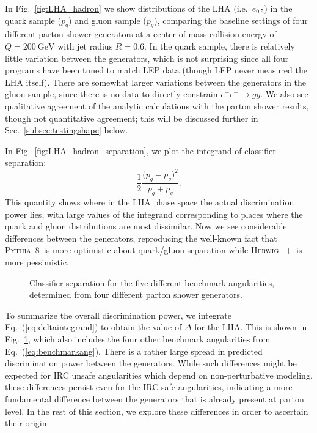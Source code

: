 \documentclass[11pt,letterpaper]{article}
\newcommand{\GeV}{\text{GeV}}
\newcommand{\pythia}{\textsc{Pythia~8}\xspace}
\newcommand{\herwig}{\textsc{Herwig++}\xspace}
\DeclareRobustCommand{\Sec}[1]{Sec.~\ref{#1}}
\DeclareRobustCommand{\Fig}[1]{Fig.~\ref{#1}}
\DeclareRobustCommand{\Eq}[1]{Eq.~(\ref{#1})}
\newcommand{\be}{\begin{equation}}
\newcommand{\ee}{\end{equation}}
\begin{document}
In \Fig{fig:LHA_hadron} we show distributions of the LHA (i.e.~$e_{0.5}$) in the quark sample ($p_q$) and gluon sample ($p_g$), comparing the baseline settings of four different parton shower generators at a center-of-mass collision energy of $Q = 200~\GeV$ with jet radius $R = 0.6$. In the quark sample, there is relatively little variation between the generators, which is not surprising since all four programs have been tuned to match LEP data (though LEP never measured the LHA itself).  There are somewhat larger variations between the generators in the gluon sample, since there is no data to directly constrain $e^+ e^- \to gg$.  We also see qualitative agreement of the analytic calculations with the parton shower results, though not quantitative agreement; this will be discussed further in \Sec{subsec:testingshape} below.  


In \Fig{fig:LHA_hadron_separation}, we plot the integrand of classifier separation:
\be
\label{eq:deltaintegrand}
\frac{1}{2} \frac{\bigl(p_q - p_g\bigr)^2}{p_q + p_g}.
\ee
This quantity shows where in the LHA phase space the actual discrimination power lies, with large values of the integrand corresponding to places where the quark and gluon distributions are most dissimilar.  Now we see considerable differences between the generators, reproducing the well-known fact that \pythia\ is more optimistic about quark/gluon separation while \herwig\ is more pessimistic.

\begin{figure}
\centering
{}
\caption{Classifier separation for the five different benchmark angularities, determined from four different parton shower generators.}
\label{fig:summary_hadron_all}
\end{figure}

To summarize the overall discrimination power, we integrate \Eq{eq:deltaintegrand} to obtain the value of $\Delta$ for the LHA.  This is shown in \Fig{fig:summary_hadron_all}, which also includes the four other benchmark angularities from \Eq{eq:benchmarkang}.  There is a rather large spread in predicted discrimination power between the generators.  While such differences might be expected for IRC unsafe angularities which depend on non-perturbative modeling, these differences persist even for the IRC safe angularities, indicating a more fundamental difference between the generators that is already present at parton level.  In the rest of this section, we explore these differences in order to ascertain their origin.
\end{document}
